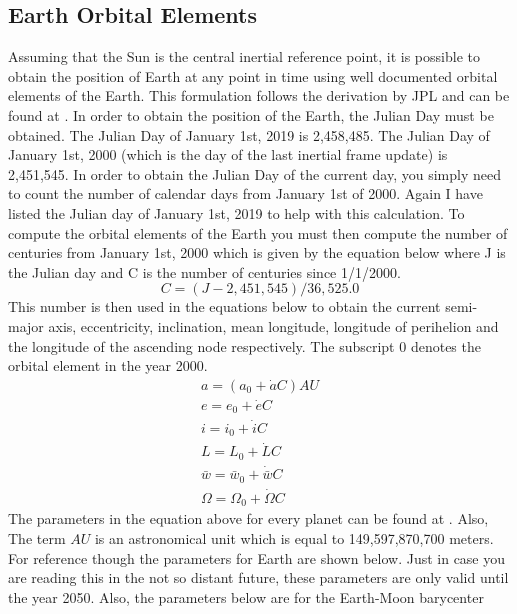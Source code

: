 \documentclass{article}
\begin{document}
\subsection{Earth Orbital Elements}\label{s:ephemeris}

Assuming that the Sun is the central inertial reference point, it is
possible to obtain the position of Earth at any point in time using
well documented orbital elements of the Earth. This formulation
follows the derivation by JPL and can be found at \cite{JPL}. In order
to obtain the position of the Earth, the Julian Day must be
obtained. The Julian Day of January 1st, 2019 is 2,458,485. The Julian
Day of January 1st, 2000 (which is the day of the last inertial frame
update) is 2,451,545. In order to obtain the Julian Day of the current
day, you simply need to count the number of calendar days from January
1st of 2000. Again I have listed the Julian day of January 1st, 2019
to help with this calculation. To compute the orbital elements of the
Earth you must then compute the number of centuries from January 1st,
2000 which is given by the equation below where J is the Julian day
and C is the number of centuries since 1/1/2000. 
\begin{equation}
  C = (J - 2,451,545)/36,525.0
\end{equation}
This number is then used in the equations below to obtain the current
semi-major axis, eccentricity, inclination, mean longitude, longitude
of perihelion and the longitude of the ascending node
respectively. The subscript $0$ denotes the orbital element in the
year 2000.
\begin{equation}
  \begin{matrix}
    a = (a_0 + \dot{a}C)AU \\
    e = e_0 + \dot{e}C \\
    i = i_0 + \dot{i}C \\
    L = L_0 + \dot{L}C \\
    \bar{w} = \bar{w}_0 + \dot{\bar{w}}C \\
    \Omega = \Omega_0 + \dot{\Omega}C
  \end{matrix}
\end{equation}
The parameters in the equation above for every planet can be found at
\cite{JPL}. Also, The term $AU$ is an astronomical unit which is equal
to 149,597,870,700 meters. For reference though the parameters for
Earth are shown below. Just in case you are reading this in the not so
distant future, these parameters are only valid until the year
2050. Also, the parameters below are for the Earth-Moon barycenter
\end{document}

